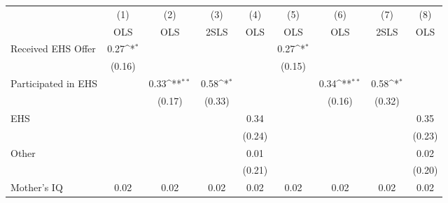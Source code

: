 {
\def\sym#1{\ifmmode^{#1}\else\(^{#1}\)\fi}
\begin{tabular}{l*{8}{c}}
\hline\hline
                    &\multicolumn{1}{c}{(1)}&\multicolumn{1}{c}{(2)}&\multicolumn{1}{c}{(3)}&\multicolumn{1}{c}{(4)}&\multicolumn{1}{c}{(5)}&\multicolumn{1}{c}{(6)}&\multicolumn{1}{c}{(7)}&\multicolumn{1}{c}{(8)}\\
                    &\multicolumn{1}{c}{OLS}&\multicolumn{1}{c}{OLS}&\multicolumn{1}{c}{2SLS}&\multicolumn{1}{c}{OLS}&\multicolumn{1}{c}{OLS}&\multicolumn{1}{c}{OLS}&\multicolumn{1}{c}{2SLS}&\multicolumn{1}{c}{OLS}\\
\hline
Received EHS Offer  &        0.27\sym{*}  &                     &                     &                     &        0.27\sym{*}  &                     &                     &                     \\
                    &      (0.16)         &                     &                     &                     &      (0.15)         &                     &                     &                     \\
[1em]
Participated in EHS &                     &        0.33\sym{**} &        0.58\sym{*}  &                     &                     &        0.34\sym{**} &        0.58\sym{*}  &                     \\
                    &                     &      (0.17)         &      (0.33)         &                     &                     &      (0.16)         &      (0.32)         &                     \\
[1em]
EHS                 &                     &                     &                     &        0.34         &                     &                     &                     &        0.35         \\
                    &                     &                     &                     &      (0.24)         &                     &                     &                     &      (0.23)         \\
[1em]
Other               &                     &                     &                     &        0.01         &                     &                     &                     &        0.02         \\
                    &                     &                     &                     &      (0.21)         &                     &                     &                     &      (0.20)         \\
[1em]
Mother's IQ         &        0.02         &        0.02         &        0.02         &        0.02         &        0.02         &        0.02         &        0.02         &        0.02         \\

\end{tabular}}

